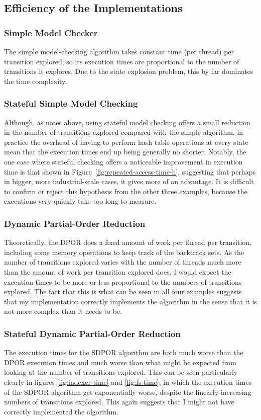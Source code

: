 \documentclass[12pt,a4paper,twoside,openright]{report}
\begin{document}
\subsection{Efficiency of the Implementations}
\subsubsection{Simple Model Checker}
The simple model-checking algorithm takes
constant time (per thread) per transition
explored, so its execution times are
proportional to the number of transitions it
explores. Due to the state explosion problem,
this by far dominates the time complexity.

\subsubsection{Stateful Simple Model Checking}
Although, as notes above, using stateful model
checking offers a small reduction in the number
of transitions explored compared with the simple
algorithm, in practice the overhead of having
to perform hash table operations at every state
mean that the execution times end up being
generally no shorter. Notably, the one
case where stateful checking offers a noticeable
improvement in execution time is that shown in
Figure~\ref{fig:repeated-access-time-h},
suggesting that perhaps in bigger, more
industrial-scale cases, it gives more of
an advantage. It is difficult to confirm
or reject this hypothesis from the other three examples,
because the executions very quickly take too
long to measure.

\subsubsection{Dynamic Partial-Order Reduction}
Theoretically, the DPOR does a fixed amount of
work per thread per transition, including some
memory operations to keep track of the backtrack
sets. As the number of transitions explored
varies with
the number of threads much more than the amount
of work per transition explored does, I would
expect the execution times to be more or less
proportional to the numbers of transitions
explored. The fact that this is what can be
seen in all four examples suggests that my
implementation correctly implements the
algorithm in the sense that it is not more
complex than it needs to be.

\subsubsection{Stateful Dynamic Partial-Order Reduction}
The execution times for the SDPOR algorithm
are both much worse than the DPOR execution
times and much worse than what might be
expected from looking at the number of
transitions explored. This can be
seen particularly clearly in figures
\ref{fig:indexer-time} and \ref{fig:fs-time},
in which the execution times of the SDPOR
algorithm get exponentially worse, despite
the linearly-increasing numbers of
transitions explored. This again
suggests that I might not have
correctly implemented the algorithm.
\end{document}
